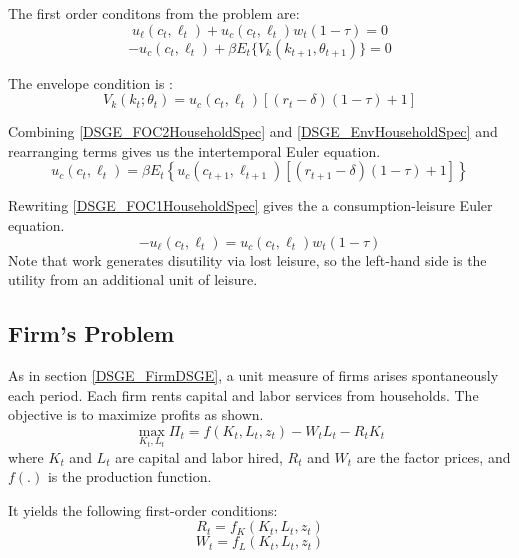 \documentclass[letterpaper,12pt]{article}
\theoremstyle{definition}
\begin{document}
\begin{spacing}{1.5}
		The first order conditons from the problem are:
		\begin{equation}\label{DSGE_FOC1HouseholdSpec}
		u_{\ell}(c_t,\ell_t) + u_{c}(c_t,\ell_t)w_t (1-\tau)= 0
		\end{equation}
		\begin{equation}\label{DSGE_FOC2HouseholdSpec}
		 -u_c(c_t,\ell_t) + \beta E_t\{V_k(k_{t+1},\theta_{t+1})\} = 0
		\end{equation}

		The envelope condition is :
		\begin{equation}\label{DSGE_EnvHouseholdSpec}
		V_k(k_t;\theta_t) = u_c(c_t,\ell_t)[(r_t-\delta)(1-\tau)+1]
		\end{equation}

		Combining \eqref{DSGE_FOC2HouseholdSpec} and \eqref{DSGE_EnvHouseholdSpec} and rearranging terms gives us the intertemporal Euler equation.
		\begin{equation}\label{DSGE_Euler2HouseholdSpec}
		u_c(c_t,\ell_t) = \beta E_t\left\{ u_c(c_{t+1},\ell_{t+1})[(r_{t+1}-\delta)(1-\tau)+1] \right\}
		\end{equation}

		Rewriting \eqref{DSGE_FOC1HouseholdSpec} gives the a consumption-leisure Euler equation.
		\begin{equation}\label{DSGE_EulerBHouseholdSpec}
		-u_{\ell}(c_t,\ell_t) = u_{c}(c_t,\ell_t)w_t(1-\tau)
		\end{equation}
		Note that work generates disutility via lost leisure, so the left-hand side is the utility from an additional unit of leisure.

	\subsection{Firm's Problem}
		As in section \ref{DSGE_FirmDSGE}, a unit measure of firms arises spontaneously each period. Each firm rents capital and labor services from households. The objective is to maximize profits as shown.
		\begin{equation}
		\max_{K_t,L_t} \Pi_t = f(K_t,L_t,z_t) - W_tL_t-R_tK_t \nonumber
		\end{equation}
		where $K_t$ and $L_t$ are capital and labor hired, $R_t$ and $W_t$ are the factor prices, and $f(.)$ is the production function.

		It yields the following first-order conditions:
		\begin{equation}
		R_t = f_K(K_t,L_t,z_t)
		\end{equation}
		\begin{equation}
		W_t = f_L(K_t,L_t,z_t)
		\end{equation}


\end{spacing}
\end{document}
